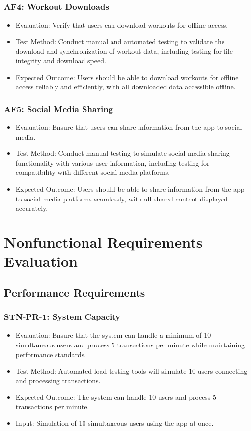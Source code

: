 \documentclass[12pt, titlepage]{article}
\begin{document}
\subsubsection{AF4: Workout Downloads}
\begin{itemize}
    \item Evaluation: Verify that users can download workouts for offline access.
    \item Test Method: Conduct manual and automated testing to validate the download and synchronization of workout data, including testing for file integrity and download speed.
    \item Expected Outcome: Users should be able to download workouts for offline access reliably and efficiently, with all downloaded data accessible offline.
\end{itemize}

\subsubsection{AF5: Social Media Sharing}
\begin{itemize}
    \item Evaluation: Ensure that users can share information from the app to social media.
    \item Test Method: Conduct manual testing to simulate social media sharing functionality with various user information, including testing for compatibility with different social media platforms.
    \item Expected Outcome: Users should be able to share information from the app to social media platforms seamlessly, with all shared content displayed accurately.
\end{itemize}
\section{Nonfunctional Requirements Evaluation}


\subsection{Performance Requirements}

\subsubsection{STN-PR-1: System Capacity}
\begin{itemize}
    \item Evaluation: Ensure that the system can handle a minimum of 10 simultaneous users and process 5 transactions per minute while maintaining performance standards.
    \item Test Method: Automated load testing tools will simulate 10 users connecting and processing transactions.
    \item Expected Outcome: The system can handle 10 users and process 5 transactions per minute.
    \item Input: Simulation of 10 simultaneous users using the app at once.
\end{itemize}
\end{document}
